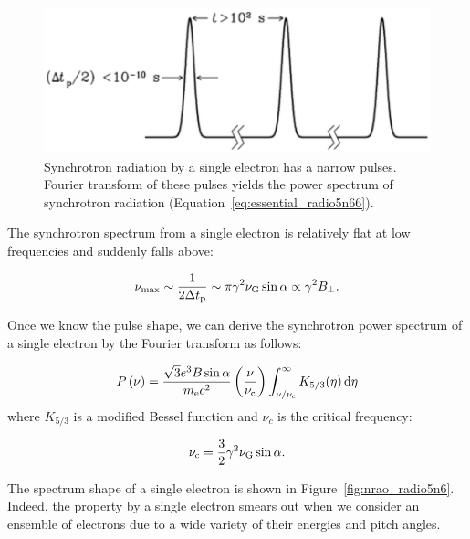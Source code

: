 \begin{figure}[htbp]
	\centering
	\includegraphics[width=.7\linewidth]{Chapter_2/Figures/NRAO_radio5n5.png}
    \caption[Synchrotron pulse by a single electron]{\label{fig:nrao_radio5n5}
        Synchrotron radiation by a single electron has a narrow pulses.
        Fourier transform of these pulses yields the power spectrum of synchrotron radiation (Equation~\ref{eq:essential_radio5n66}).
    }
\end{figure}


The synchrotron spectrum from a single electron is relatively flat at low frequencies and suddenly falls above:

\begin{equation}\label{eq:essential_radio5n65}
    \nu_{\max} \sim \frac{1}{2 \Delta t_{\mathrm{p}}} \sim \pi \gamma^2 \nu_{\mathrm{G}} \sin \alpha \propto \gamma^2 B_{\perp}.
\end{equation}

Once we know the pulse shape, we can derive the synchrotron power spectrum of a single electron by the Fourier transform as follows:

\begin{equation}\label{eq:essential_radio5n66}
    P\left(\nu\right) = \frac{\sqrt{3} e^3 B \sin \alpha}{m_{\mathrm{e}} c^2}\left(\frac{\nu}{\nu_{\mathrm{c}}}\right) \int_{\nu / \nu_{\mathrm{c}}}^{\infty} K_{5/3}(\eta)\,\mathrm{d}\eta
\end{equation}
 where $K_{5/3}$ is a modified Bessel function and $\nu_c$ is the critical frequency:

\begin{equation}\label{eq:essential_radio5n67}
    \nu_{\mathrm{c}} = \frac{3}{2} \gamma^2 \nu_{\mathrm{G}} \sin \alpha.
\end{equation}

The spectrum shape of a single electron is shown in Figure~\ref{fig:nrao_radio5n6}.
Indeed, the property by a single electron smears out when we consider an ensemble of electrons due to a wide variety of their energies and pitch angles.

